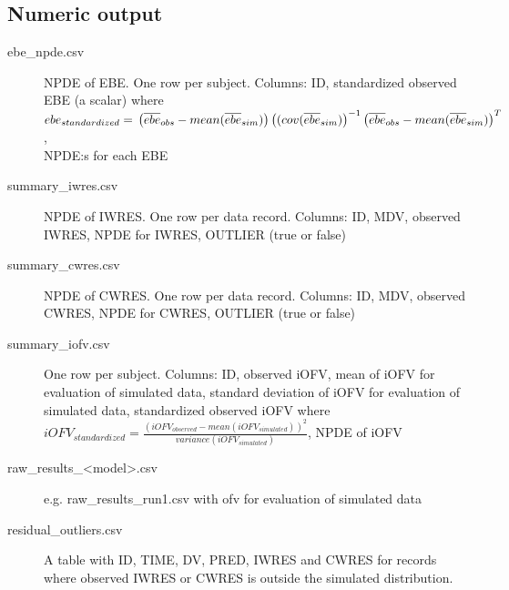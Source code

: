 \subsection{Numeric output}
\begin{description}
\item[ebe\_npde.csv] NPDE of EBE. One row per subject. Columns: ID,
standardized observed EBE (a scalar) where 
$ebe_{standardized}= \\
\left(\overline{ebe}_{obs} - mean (\overline{ebe}_{sim})\right)\left((cov(\overline{ebe}_{sim})\right)^{-1}
\left(\overline{ebe}_{obs} - mean (\overline{ebe}_{sim})\right)^T$,\\ 
NPDE:s for each EBE
\item[summary\_iwres.csv] NPDE of IWRES. One row per data record. Columns: ID, MDV, observed IWRES, NPDE for IWRES, OUTLIER (true or false)
\item[summary\_cwres.csv] NPDE of CWRES. One row per data record. Columns: ID, MDV, observed CWRES, NPDE for CWRES, OUTLIER (true or false)
\item[summary\_iofv.csv] One row per subject. Columns: ID, observed iOFV,
mean of iOFV for evaluation of simulated data,
standard deviation of iOFV for evaluation of simulated data,
standardized observed iOFV where
$iOFV_{standardized}=\frac{(iOFV_{observed} - mean (iOFV_{simulated}))^2}{variance(iOFV_{simulated})}$, NPDE of iOFV
\item[raw\_results\_<model>.csv] e.g. raw\_results\_run1.csv with ofv for evaluation of simulated data
\item[residual\_outliers.csv] A table with ID, TIME, DV, PRED, IWRES and CWRES for records
where observed IWRES or CWRES is outside the simulated distribution.
\end{description}

